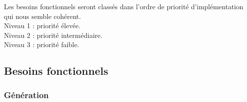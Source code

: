 \documentclass[a4paper,12pt]{article}
\begin{document}
\begin{flushleft}
Les besoins fonctionnels seront classés dans l'ordre de priorité d'implémentation qui nous semble cohérent.\\
Niveau 1 : priorité élevée.\\
Niveau 2 : priorité intermédiaire.\\
Niveau 3 : priorité faible.
\end{flushleft}

\subsection{Besoins fonctionnels}


\subsubsection{Génération}
\end{document}

